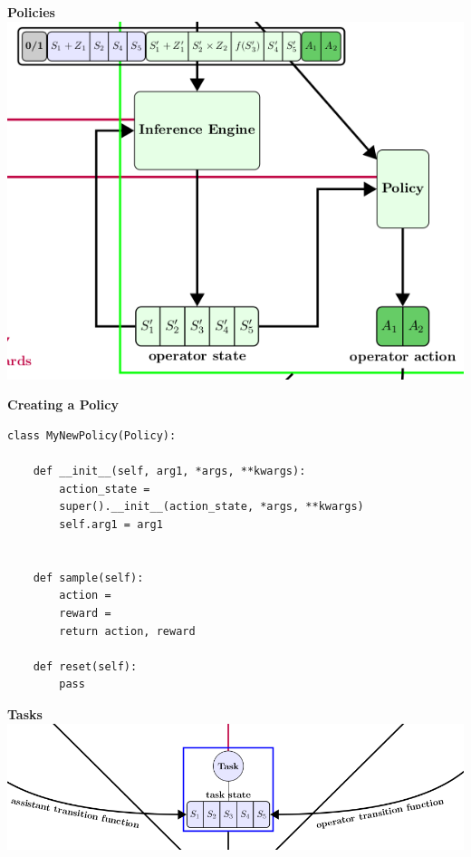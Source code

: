 \documentclass[11pt, xcolor = {dvipsnames}]{beamer}
\begin{document}
\begin{frame}{\textbf{Policies}}
\centering
\includegraphics[height = .7\textheight]{fig/policy.png} 
\end{frame}

\begin{frame}[fragile]{\textbf{Creating a Policy}}
\begin{adjustbox}{height=.4\textheight}\lstset{language=Python}
\lstset{frame=lines}
\lstset{basicstyle=\footnotesize}
\begin{lstlisting}
class MyNewPolicy(Policy):
 
    def __init__(self, arg1, *args, **kwargs):
        action_state =
        super().__init__(action_state, *args, **kwargs)
        self.arg1 = arg1
        

    def sample(self):
        action =
        reward = 
        return action, reward

    def reset(self):
        pass

\end{lstlisting}
\end{adjustbox}
\end{frame}


\begin{frame}{\textbf{Tasks}}
\centering
\includegraphics[width = \textwidth]{fig/tasks.png} 
\end{frame}
\end{document}
